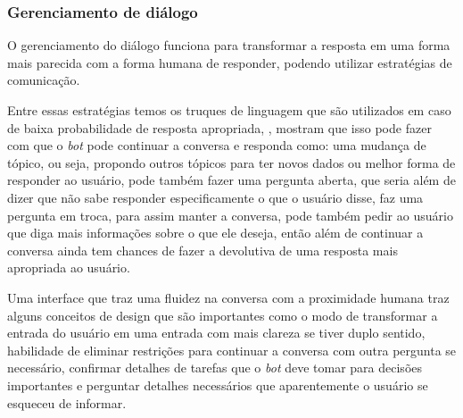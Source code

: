 \documentclass[
	12pt,				%
	oneside,
	a4paper,			%
	english,			%
	french,				%
	spanish,			%
	brazil				%
	]{abntex2}
\begin{document}
\subsubsection{Gerenciamento de diálogo}
O gerenciamento do diálogo funciona para transformar a resposta em uma forma mais parecida com a forma humana de responder, podendo utilizar estratégias de comunicação.

Entre essas estratégias temos os truques de linguagem que são utilizados em caso de baixa probabilidade de resposta apropriada, \textcite{dialogue-manag.}, mostram que isso pode fazer com que o \emph{bot} pode continuar a conversa e responda como: uma mudança de tópico, ou seja, propondo outros tópicos para ter novos dados ou melhor forma de responder ao usuário, pode também fazer uma pergunta aberta, que seria além de dizer que não sabe responder especificamente o que o usuário disse, faz uma pergunta em troca, para assim manter a conversa, pode também pedir ao usuário que diga mais informações sobre o que ele deseja, então além de continuar a conversa ainda tem chances de fazer a devolutiva de uma resposta mais apropriada ao usuário.

Uma interface que traz uma fluidez na conversa com a proximidade humana traz alguns conceitos de design que são importantes como o modo de transformar a entrada do usuário em uma entrada com mais clareza se tiver duplo sentido, habilidade de eliminar restrições para continuar a conversa com outra pergunta se necessário, confirmar detalhes  de tarefas que o \emph{bot} deve tomar para decisões importantes e perguntar detalhes necessários que aparentemente o usuário se esqueceu de informar.


\end{document}
